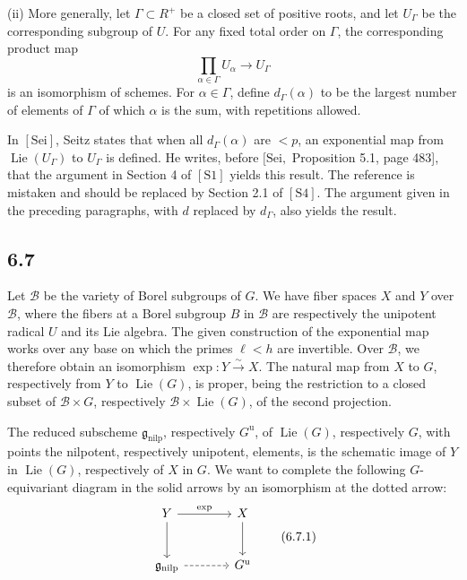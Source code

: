 \documentclass[11pt]{article}
\newcommand{\Lie}{\operatorname{Lie}}
\newcommand{\nilp}{\mathrm{nilp}}
\newcommand{\unip}{\mathrm u}
\begin{document}
(ii) More generally, let \(\Gamma\subset R^+\) be a closed set of positive roots, and let
\(U_\Gamma\) be the corresponding subgroup of \(U\). For any fixed total order on \(\Gamma\), the
corresponding product map
\begin{equation}
  \prod_{\alpha\in\Gamma}U_\alpha\longrightarrow U_\Gamma
  \tag{6.6.2}
\end{equation}
is an isomorphism of schemes. For \(\alpha\in\Gamma\), define \(d_\Gamma(\alpha)\) to be the
largest number of elements of \(\Gamma\) of which \(\alpha\) is the sum, with repetitions allowed.

In \([\mathrm{Sei}]\), Seitz states that when all \(d_\Gamma(\alpha)\) are \(<p\), an exponential
map from \(\Lie(U_\Gamma)\) to \(U_\Gamma\) is defined. He writes, before \([\mathrm{Sei},\)
Proposition 5.1, page 483], that the argument in Section 4 of \([\mathrm{S1}]\) yields this
result. The reference is mistaken and should be replaced by Section 2.1 of \([\mathrm{S4}]\). The
argument given in the preceding paragraphs, with \(d\) replaced by \(d_\Gamma\), also yields
the result.

\subsection*{6.7}
Let \(\mathcal B\) be the variety of Borel subgroups of \(G\). We have fiber spaces \(X\) and
\(Y\) over \(\mathcal B\), where the fibers at a Borel subgroup \(B\) in \(\mathcal B\) are
respectively the unipotent radical \(U\) and its Lie algebra. The given construction of the
exponential map works over any base on which the primes \(\ell<h\) are invertible. Over
\(\mathcal B\), we therefore obtain an isomorphism \(\exp:Y\xrightarrow{\sim}X\). The natural
map from \(X\) to \(G\), respectively from \(Y\) to \(\Lie(G)\), is proper, being the restriction
to a closed subset of \(\mathcal B\times G\), respectively \(\mathcal B\times\Lie(G)\), of the
second projection.

The reduced subscheme \(\mathfrak g_{\nilp}\), respectively \(G^{\unip}\), of \(\Lie(G)\),
respectively \(G\), with points the nilpotent, respectively unipotent, elements, is the
schematic image of \(Y\) in \(\Lie(G)\), respectively of \(X\) in \(G\). We want to complete the
following \(G\)-equivariant diagram in the solid arrows by an isomorphism at the dotted arrow:
\begin{equation}
\begin{tikzcd}[column sep=large,row sep=large]
  Y \arrow[r,"\exp"] \arrow[d] & X \arrow[d] \\
  \mathfrak g_{\nilp} \arrow[r,dashed] & G^{\unip}
\end{tikzcd}
\tag{6.7.1}
\end{equation}
\end{document}
